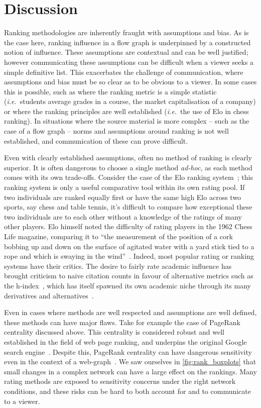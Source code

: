 \section{Discussion}

Ranking methodologies are inherently fraught with assumptions and bias. As is the case here, ranking influence in a flow graph is underpinned by a constructed notion of influence. These assumptions are contextual and can be well justified; however communicating these assumptions can be difficult when a viewer seeks a simple definitive list. This exacerbates the challenge of communication, where assumptions and bias must be so clear as to be obvious to a viewer. In some cases this is possible, such as where the ranking metric is a simple statistic (\emph{i.e.}\ students average grades in a course, the market capitalisation of a company) or where the ranking principles are well established (\emph{i.e.}\ the use of Elo in chess ranking). In situations where the source material is more complex -- such as the case of a flow graph -- norms and assumptions around ranking is not well established, and communication of these can prove difficult.

Even with clearly established assumptions, often no method of ranking is clearly superior. It is often dangerous to choose a single method \emph{ad-hoc}, as each method comes with its own trade-offs. Consider the case of the Elo ranking system~\cite{elo_rating_1978}; this ranking system is only a useful comparative tool within its own rating pool. If two individuals are ranked equally first or have the same high Elo across two sports, say chess and table tennis, it's difficult to compare how exceptional these two individuals are to each other without a knowledge of the ratings of many other players. Elo himself noted the difficulty of rating players in the 1962 Chess Life magazine, comparing it to ``the measurement of the position of a cork bobbing up and down on the surface of agitated water with a yard stick tied to a rope and which is swaying in the wind''~\cite{eloUSCFRatingFormulae1962}. Indeed, most popular rating or ranking systems have their critics. The desire to fairly rate academic influence has brought criticism to naive citation counts in favour of alternative metrics such as the h-index~\cite{hirsch_index_2005}, which has itself spawned its own academic niche through its many derivatives and alternatives~\cite{alonso_h-index_2009}. 

Even in cases where methods are well respected and assumptions are well defined, these methods can have major flaws. Take for example the case of PageRank centrality discussed above. This centrality is considered robust and well established in the field of web page ranking, and underpins the original Google search engine~\cite{brin_anatomy_1998}. Despite this, PageRank centrality can have dangerous sensitivity even in the context of a web-graph~\cite{ng_link_2001}. We saw ourselves in \autoref{fig:rank_boxplots} that small changes in a complex network can have a large effect on the rankings. Many rating methods are exposed to sensitivity concerns under the right network conditions, and these risks can be hard to both account for and to communicate to a viewer.

